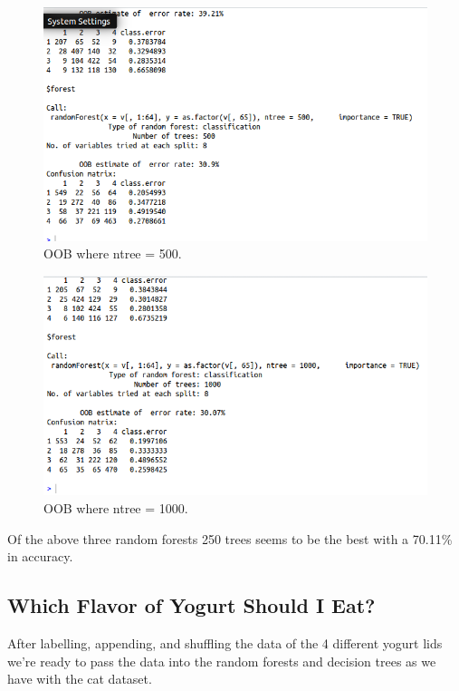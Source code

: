 \documentclass[12pt, letterpaper]{article}
\begin{document}
\begin{figure}[H]
\centering
\includegraphics[width=5.0in]{catOOB500}
\caption{OOB where ntree = 500.}
\label{fig:oob2}
\end{figure}

\begin{figure}[H]
\centering
\includegraphics[width=5.0in]{catOOB1000}
\caption{OOB where ntree = 1000.}
\label{fig:oob3}
\end{figure}

Of the above three random forests 250 trees seems to be the best with a 70.11\% in accuracy.

\subsection{Which Flavor of Yogurt Should I Eat?}
After labelling, appending, and shuffling the data of the 4 different yogurt lids we're ready to pass the data into the random forests and decision trees as we have with the cat dataset. 
\end{document}
